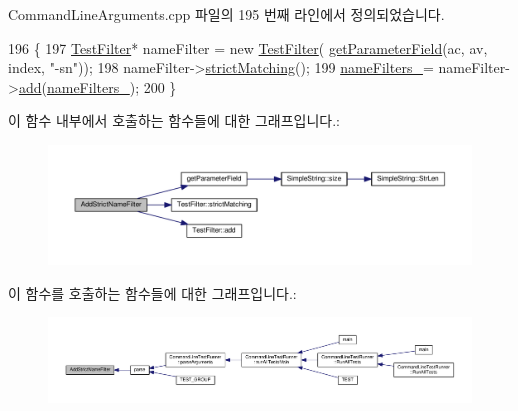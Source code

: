 Command\+Line\+Arguments.\+cpp 파일의 195 번째 라인에서 정의되었습니다.


\begin{DoxyCode}
196 \{
197     \hyperlink{class_test_filter}{TestFilter}* nameFilter = \textcolor{keyword}{new} \hyperlink{class_test_filter}{TestFilter}(
      \hyperlink{class_command_line_arguments_acea2499d001a6bd1a67c2ece97a5632c}{getParameterField}(ac, av, index, \textcolor{stringliteral}{"-sn"}));
198     nameFilter->\hyperlink{class_test_filter_a67e3ce804b0e3a08b8c7a4655e77e4ff}{strictMatching}();
199     \hyperlink{class_command_line_arguments_ad2305aa697f8aab0ff0cbe9de842da56}{nameFilters\_}= nameFilter->\hyperlink{class_test_filter_ae532a4739c31605009dfd14f374c8a69}{add}(\hyperlink{class_command_line_arguments_ad2305aa697f8aab0ff0cbe9de842da56}{nameFilters\_});
200 \}
\end{DoxyCode}


이 함수 내부에서 호출하는 함수들에 대한 그래프입니다.\+:
\nopagebreak
\begin{figure}[H]
\begin{center}
\leavevmode
\includegraphics[width=350pt]{class_command_line_arguments_ac9897b3198df515592a4a655818aad6a_cgraph}
\end{center}
\end{figure}




이 함수를 호출하는 함수들에 대한 그래프입니다.\+:
\nopagebreak
\begin{figure}[H]
\begin{center}
\leavevmode
\includegraphics[width=350pt]{class_command_line_arguments_ac9897b3198df515592a4a655818aad6a_icgraph}
\end{center}
\end{figure}


